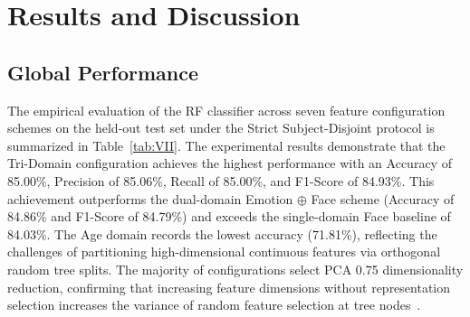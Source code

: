 \section{Results and Discussion}
\label{sec:results_and_discussion}

\subsection{Global Performance}
\label{sec:global_performance}
\label{sec:global_performance_analysis}
\label{sec:global_classification_performance}

The empirical evaluation of the RF classifier across seven feature configuration schemes on the held-out test set under the Strict Subject-Disjoint protocol is summarized in Table~\ref{tab:VII}. The experimental results demonstrate that the Tri-Domain configuration achieves the highest performance with an Accuracy of 85.00\%, Precision of 85.06\%, Recall of 85.00\%, and F1-Score of 84.93\%. This achievement outperforms the dual-domain Emotion $\oplus$ Face scheme (Accuracy of 84.86\% and F1-Score of 84.79\%) and exceeds the single-domain Face baseline of 84.03\%. The Age domain records the lowest accuracy (71.81\%), reflecting the challenges of partitioning high-dimensional continuous features via orthogonal random tree splits. The majority of configurations select PCA 0.75 dimensionality reduction, confirming that increasing feature dimensions without representation selection increases the variance of random feature selection at tree nodes~\cite{ref48}.

